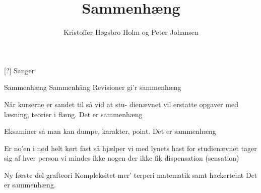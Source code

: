 \documentclass[a4paper,11pt]{article}
\title{Sammenhæng}
\author{Kristoffer Høgsbro Holm og Peter Johansen}
\begin{document}
\maketitle

\begin{roles}
[?] Sanger
\end{roles}

\begin{song}

Sammenhæng
Sammenhång
Revisioner gi'r sammenhæng

Når kurserne
er sandet til
så vid at stu-
dienævnet vil
erstatte opgaver med læsning, teorier i flæng.
Det er sammenhæng

Eksaminer så man kan dumpe,
karakter, point.
Det er sammenhæng

Er no'en i nød
helt kørt fast
så hjælper vi
med lynets hast
for studienævnet tager sig af hver person
vi mindes ikke nogen der ikke fik dispensation (sensation)

Ny første del
grafteori
Kompleksitet
mer' terperi
matematik samt hackerteint
Det er sammenhæng.

\end{song}
\end{document}
